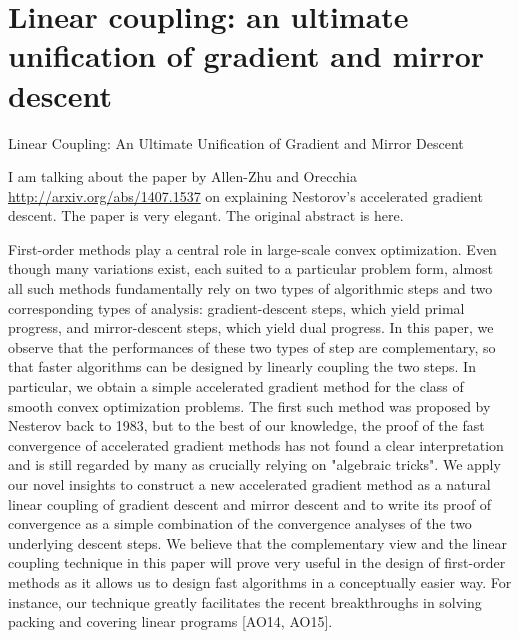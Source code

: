 \def\filepath{C:/Users/Owner/Dropbox/Math/templates}





%


%

\pagestyle{fancy}
\chead{} 
\rhead{} 
\lfoot{} 
\cfoot{\thepage} 
\rfoot{} 
\renewcommand{\headrulewidth}{.3pt} 
\setlength\voffset{0in}
\setlength\textheight{648pt}


\section{Linear coupling: an ultimate unification of gradient and mirror descent}

Linear Coupling: An Ultimate Unification of Gradient and Mirror Descent

I am talking about the paper by Allen-Zhu and Orecchia \url{http://arxiv.org/abs/1407.1537} on explaining Nestorov's accelerated gradient descent. The paper is very elegant. The original abstract is here. 

First-order methods play a central role in large-scale convex optimization. Even though many variations exist, each suited to a particular problem form, almost all such methods fundamentally rely on two types of algorithmic steps and two corresponding types of analysis: gradient-descent steps, which yield primal progress, and mirror-descent steps, which yield dual progress. In this paper, we observe that the performances of these two types of step are complementary, so that faster algorithms can be designed by linearly coupling the two steps. 
In particular, we obtain a simple accelerated gradient method for the class of smooth convex optimization problems. The first such method was proposed by Nesterov back to 1983, but to the best of our knowledge, the proof of the fast convergence of accelerated gradient methods has not found a clear interpretation and is still regarded by many as crucially relying on "algebraic tricks". We apply our novel insights to construct a new accelerated gradient method as a natural linear coupling of gradient descent and mirror descent and to write its proof of convergence as a simple combination of the convergence analyses of the two underlying descent steps. 
We believe that the complementary view and the linear coupling technique in this paper will prove very useful in the design of first-order methods as it allows us to design fast algorithms in a conceptually easier way. For instance, our technique greatly facilitates the recent breakthroughs in solving packing and covering linear programs [AO14, AO15].

